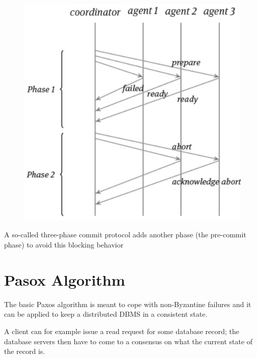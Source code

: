 \begin{figure}[h!]
\centering
\includegraphics[width=.5\linewidth]{images/AdvancedDataManagment/distribute_concurrency_control/2pc-abort_case.jpeg}
\end{figure}

A so-called three-phase commit protocol adds another phase (the pre-commit phase) to avoid this blocking behavior

\section{Pasox Algorithm}
The basic Paxos algorithm is meant to cope with non-Byzantine failures and it can be applied to keep a distributed DBMS in a consistent state.

A client can for example issue a read request for some database record; the database servers then have to come to a consensus on what the current state of the record is.

